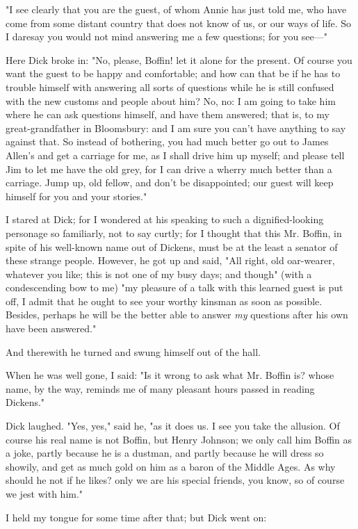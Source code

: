 "I see clearly that you are the guest, of whom Annie has just told me,
who have come from some distant country that does not know of us, or our
ways of life. So I daresay you would not mind answering me a few
questions; for you see---"

Here Dick broke in: "No, please, Boffin! let it alone for the present.
Of course you want the guest to be happy and comfortable; and how can
that be if he has to trouble himself with answering all sorts of
questions while he is still confused with the new customs and people
about him? No, no: I am going to take him where he can ask questions
himself, and have them answered; that is, to my great-grandfather in
Bloomsbury: and I am sure you can't have anything to say against that.
So instead of bothering, you had much better go out to James Allen's and
get a carriage for me, as I shall drive him up myself; and please tell
Jim to let me have the old grey, for I can drive a wherry much better
than a carriage. Jump up, old fellow, and don't be disappointed; our
guest will keep himself for you and your stories."

I stared at Dick; for I wondered at his speaking to such a
dignified-looking personage so familiarly, not to say curtly; for I
thought that this Mr. Boffin, in spite of his well-known name out of
Dickens, must be at the least a senator of these strange people.
However, he got up and said, "All right, old oar-wearer, whatever you
like; this is not one of my busy days; and though" (with a condescending
bow to me) "my pleasure of a talk with this learned guest is put off, I
admit that he ought to see your worthy kinsman as soon as possible.
Besides, perhaps he will be the better able to answer \emph{my}
questions after his own have been answered."

And therewith he turned and swung himself out of the hall.

When he was well gone, I said: "Is it wrong to ask what Mr. Boffin is?
whose name, by the way, reminds me of many pleasant hours passed in
reading Dickens."

Dick laughed. "Yes, yes," said he, "as it does us. I see you take the
allusion. Of course his real name is not Boffin, but Henry Johnson; we
only call him Boffin as a joke, partly because he is a dustman, and
partly because he will dress so showily, and get as much gold on him as
a baron of the Middle Ages. As why should he not if he likes? only we
are his special friends, you know, so of course we jest with him."

I held my tongue for some time after that; but Dick went on:

